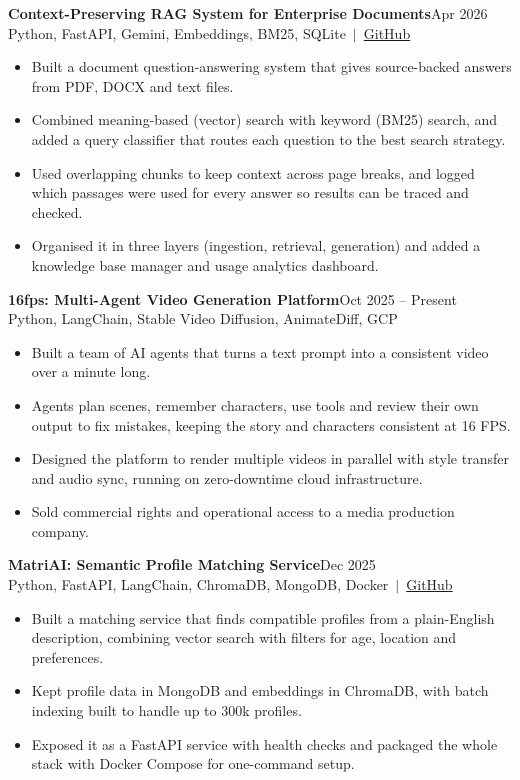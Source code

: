 \documentclass[a4paper,10pt]{article}
\newcommand{\project}[3]{\textbf{#1}\hfill #2\\{\small #3}\par\vspace{-2pt}}
\newcommand{\gap}{\vspace{5pt}}
\begin{document}
\project{Context-Preserving RAG System for Enterprise Documents}{Apr 2026}{Python, FastAPI, Gemini, Embeddings, BM25, SQLite \,$|$\, \href{https://github.com/nithin434/Context-Preserving}{GitHub}}
\begin{itemize}
  \item Built a document question-answering system that gives source-backed answers from PDF, DOCX and text files.
  \item Combined meaning-based (vector) search with keyword (BM25) search, and added a query classifier that routes each question to the best search strategy.
  \item Used overlapping chunks to keep context across page breaks, and logged which passages were used for every answer so results can be traced and checked.
  \item Organised it in three layers (ingestion, retrieval, generation) and added a knowledge base manager and usage analytics dashboard.
\end{itemize}
\gap

\project{16fps: Multi-Agent Video Generation Platform}{Oct 2025 -- Present}{Python, LangChain, Stable Video Diffusion, AnimateDiff, GCP}
\begin{itemize}
  \item Built a team of AI agents that turns a text prompt into a consistent video over a minute long.
  \item Agents plan scenes, remember characters, use tools and review their own output to fix mistakes, keeping the story and characters consistent at 16 FPS.
  \item Designed the platform to render multiple videos in parallel with style transfer and audio sync, running on zero-downtime cloud infrastructure.
  \item Sold commercial rights and operational access to a media production company.
\end{itemize}
\gap

\project{MatriAI: Semantic Profile Matching Service}{Dec 2025}{Python, FastAPI, LangChain, ChromaDB, MongoDB, Docker \,$|$\, \href{https://github.com/nithin434/matriAI}{GitHub}}
\begin{itemize}
  \item Built a matching service that finds compatible profiles from a plain-English description, combining vector search with filters for age, location and preferences.
  \item Kept profile data in MongoDB and embeddings in ChromaDB, with batch indexing built to handle up to 300k profiles.
  \item Exposed it as a FastAPI service with health checks and packaged the whole stack with Docker Compose for one-command setup.
\end{itemize}
\gap
\end{document}
